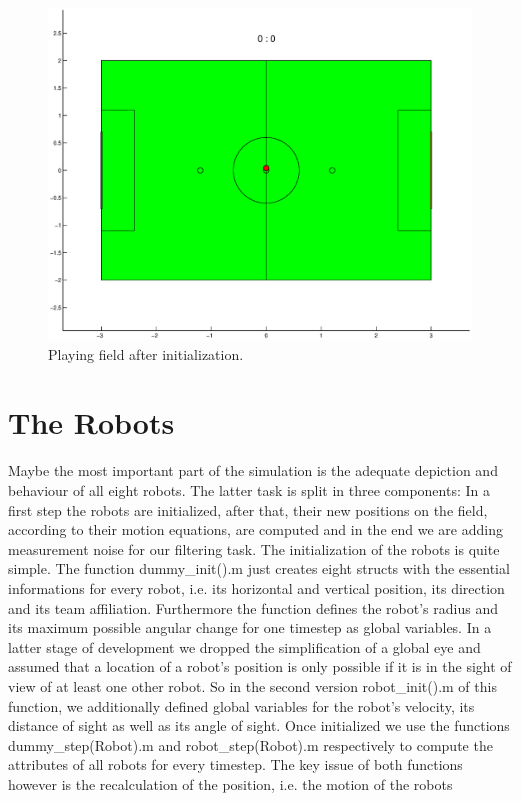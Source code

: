 \begin{figure}[htbp]
	\centering
    	\includegraphics[width=12cm]{./2_Simulation/playing_field}
  	\caption{Playing field after initialization.}
  	\label{Playing_field}
\end{figure}


\section{The Robots}

Maybe the most important part of the simulation is the adequate depiction and behaviour of all eight robots. The latter task is split in three components: In a first step the robots are initialized, after that, their new positions on the field, according to their motion equations, are computed and in the end we are adding measurement noise for our filtering task. The initialization of the robots is quite simple. The function {\selectfont dummy\_init().m} just creates eight structs with the essential informations for every robot, i.e. its horizontal and vertical position, its direction and its team affiliation. Furthermore the function defines the robot's radius and its maximum possible angular change for one timestep as global variables. In a latter stage of development we dropped the simplification of a global eye and assumed that a location of a robot's position is only possible if it is in the sight of view of at least one other robot. So in the second version {\selectfont robot\_init().m} of this function, we additionally defined global variables for the robot's velocity, its distance of sight as well as its angle of sight. Once initialized we use the functions {\selectfont dummy\_step(Robot).m} and {\selectfont robot\_step(Robot).m} respectively to compute the attributes of all robots for every timestep. The key issue of both functions however is the recalculation of the position, i.e. the motion of the robots

